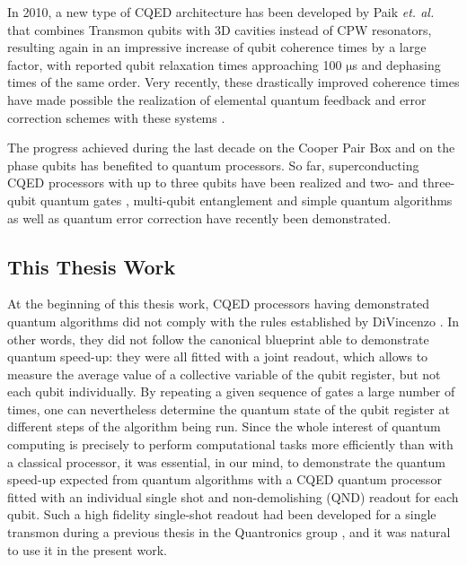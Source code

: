 In 2010, a new type of CQED architecture has been
developed by Paik {\it et. al.} \citep{paik_observation_2011} that combines Transmon
qubits with 3D cavities instead of CPW resonators, resulting again
in an impressive increase of qubit coherence times by a large factor, with reported qubit relaxation times approaching 100 $\mathrm{\mu}$s and dephasing times of the same order.
Very recently, these drastically improved coherence times have made
possible the realization of elemental quantum feedback and error correction
schemes with these systems \citep{vijay_quantum_2012}.

\smallskip

The progress achieved during the last decade on the
Cooper Pair Box and on the phase qubits has benefited to quantum processors.
So far, superconducting CQED processors with up to three qubits have
been realized and two- and three-qubit quantum gates \citep{fedorov_implementation_2011},
multi-qubit entanglement \citep{dicarlo_preparation_2010,ansmann_violation_2009} and simple
quantum algorithms \citep{dicarlo_demonstration_2009,mariantoni_implementing_2011} as well as
quantum error correction  \citep{reed_realization_2011} have recently
been demonstrated.

\subsection{This Thesis Work}

At the beginning of this thesis work, CQED processors
having demonstrated quantum algorithms did not comply with the rules
established by DiVincenzo \citep{divincenzo_physical_2000}. In other words, they
did not follow the canonical blueprint able to demonstrate quantum
speed-up: they were all fitted with a joint readout, which allows
to measure the average value of a collective variable of the qubit
register, but not each qubit individually. By repeating a given sequence
of gates a large number of times, one can nevertheless determine the
quantum state of the qubit register at different steps of the algorithm
being run. Since the whole interest of quantum computing is precisely
to perform computational tasks more efficiently than with a classical
processor, it was essential, in our mind, to demonstrate the quantum
speed-up expected from quantum algorithms with a CQED quantum processor
fitted with an individual single shot and non-demolishing (QND) readout
for each qubit. Such a high fidelity single-shot readout had been
developed for a single transmon during a previous thesis in the Quantronics
group \citep{mallet_single-shot_2009,palacios-laloy_superconducting_2010}, and it was natural to use it in the present work.

